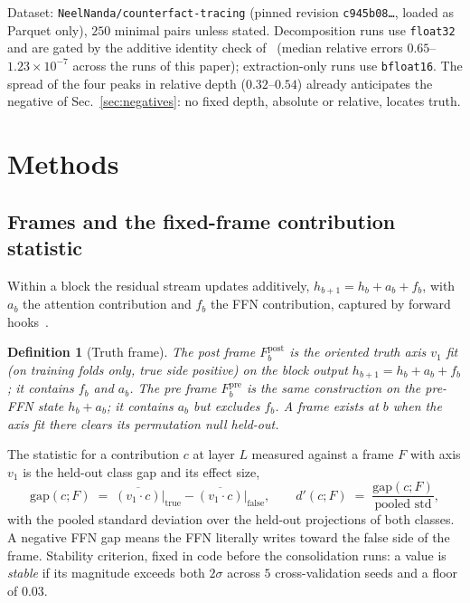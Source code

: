 \documentclass[11pt]{article}
\newtheorem{definition}{Definition}
\begin{document}
Dataset: \texttt{NeelNanda/counterfact-tracing} (pinned revision
\texttt{c945b08\ldots}, loaded as Parquet only), $250$ minimal pairs unless
stated. Decomposition runs use \texttt{float32} and are gated by the
additive identity check of~\cite{companion} (median relative errors
$0.65$--$1.23 \times 10^{-7}$ across the runs of this paper);
extraction-only runs use \texttt{bfloat16}. The spread of the four peaks in
relative depth ($0.32$--$0.54$) already anticipates the negative of
Sec.~\ref{sec:negatives}: no fixed depth, absolute or relative, locates
truth.

\section{Methods}
\label{sec:methods}

\subsection{Frames and the fixed-frame contribution statistic}
\label{sec:fixedaxis}

Within a block the residual stream updates additively,
$h_{b+1} = h_b + a_b + f_b$, with $a_b$ the attention contribution and $f_b$
the FFN contribution, captured by forward hooks~\cite{companion}.

\begin{definition}[Truth frame]
The \emph{post frame} $F_b^{\mathrm{post}}$ is the oriented truth axis $v_1$
fit (on training folds only, true side positive) on the block output
$h_{b+1} = h_b + a_b + f_b$; it contains $f_b$ and $a_b$. The \emph{pre
frame} $F_b^{\mathrm{pre}}$ is the same construction on the pre-FFN state
$h_b + a_b$; it contains $a_b$ but excludes $f_b$. A frame \emph{exists} at
$b$ when the axis fit there clears its permutation null held-out.
\end{definition}

The statistic for a contribution $c$ at layer $L$ measured against a frame
$F$ with axis $v_1$ is the held-out class gap and its effect size,
\begin{equation}
\mathrm{gap}(c; F) \;=\; \overline{(v_1 \cdot c)}\big|_{\mathrm{true}}
- \overline{(v_1 \cdot c)}\big|_{\mathrm{false}},
\qquad
d'(c; F) \;=\; \frac{\mathrm{gap}(c; F)}{\text{pooled std}},
\end{equation}
with the pooled standard deviation over the held-out projections of both
classes. A negative FFN gap means the FFN literally writes toward the false
side of the frame. Stability criterion, fixed in code before the
consolidation runs: a value is \emph{stable} if its magnitude exceeds both
$2\sigma$ across $5$ cross-validation seeds and a floor of $0.03$.
\end{document}
